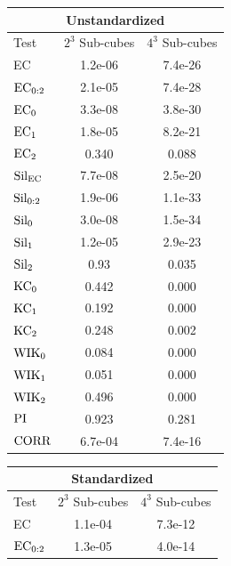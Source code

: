\documentclass[12pt]{article}
\begin{document}
\begin{table}[htp!]
    \begin{center}
        \begin{tabular}{ l | c | c }
          \toprule
          \multicolumn{3}{c}{Unstandardized} \\
          \toprule
          Test & $2^3$ Sub-cubes & $4^3$ Sub-cubes \\
          \midrule
          EC & 1.2e-06 & 7.4e-26 \\
          $\textup{EC}_{0:2}$ & 2.1e-05 & 7.4e-28 \\
          $\textup{EC}_{0}$ & 3.3e-08 & 3.8e-30 \\
          $\textup{EC}_{1}$ &  1.8e-05 & 8.2e-21 \\
          $\textup{EC}_{2}$ & 0.340 & 0.088 \\
          \midrule
          $\textup{Sil}_{\textup{EC}}$ & 7.7e-08 & 2.5e-20 \\
          $\textup{Sil}_{0:2}$ & 1.9e-06 & 1.1e-33 \\
          $\textup{Sil}_{0}$ &3.0e-08 & 1.5e-34 \\
          $\textup{Sil}_{1}$ & 1.2e-05 & 2.9e-23 \\
          $\textup{Sil}_{2}$ & 0.93 & 0.035 \\
          \midrule
          $\textup{KC}_{0}$ & 0.442 & 0.000 \\
          $\textup{KC}_{1}$ & 0.192 & 0.000 \\
          $\textup{KC}_{2}$ & 0.248 & 0.002 \\
          \midrule
          $\textup{WIK}_{0}$ & 0.084 & 0.000 \\
          $\textup{WIK}_{1}$ & 0.051 & 0.000 \\
          $\textup{WIK}_{2}$ & 0.496 & 0.000 \\
          $\textup{PI}$ & 0.923 & 0.281 \\
          \midrule
          $\textup{CORR}$ & 6.7e-04 & 7.4e-16 \\
          \bottomrule
        \end{tabular}
        \begin{tabular}{ l | c |  c }
          \toprule
          \multicolumn{3}{c}{Standardized} \\
          \toprule
          Test & $2^3$ Sub-cubes& $4^3$ Sub-cubes \\
          \midrule
          EC & 1.1e-04 &  7.3e-12 \\
          $\textup{EC}_{0:2}$ & 1.3e-05 &  4.0e-14 \\

\end{tabular}
\end{center}
\end{table}
\end{document}
